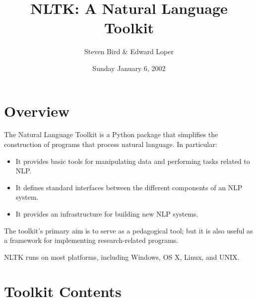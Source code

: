 \documentclass[12pt]{article}
\def\nogap{\setlength\itemsep{.0in}\setlength{\parskip}{0in}}
\begin{document}
\title{NLTK: A Natural Language Toolkit}
\author{Steven Bird \& Edward Loper}


\date{Sunday January 6, 2002}

\maketitle

\section*{Overview}
\thispagestyle{empty}

The Natural Language Toolkit is a Python package that simplifies the
construction of programs that process natural language.  In
particular:

\begin{itemize}\nogap

  \item It provides basic tools for manipulating data and performing
  tasks related to NLP.

  \item It defines standard interfaces between the different components
  of an NLP system.

  \item It provides an infrastructure for building new NLP systems.

\end{itemize}

 \noindent The toolkit's primary aim is to serve as a pedagogical
 tool; but it is also useful as a framework for implementing
 research-related programs.

\vspace{3mm}\noindent NLTK runs on most platforms, including Windows, OS X, Linux, and
UNIX.

\section*{Toolkit Contents}
\thispagestyle{empty}
\end{document}
